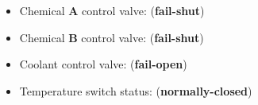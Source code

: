 





\begin{itemize}
\item{} Chemical {\bf A} control valve: ({\bf fail-shut})
\vskip 5pt
\item{} Chemical {\bf B} control valve: ({\bf fail-shut})
\vskip 5pt
\item{} Coolant control valve: ({\bf fail-open})
\vskip 5pt
\item{} Temperature switch status: ({\bf normally-closed})
\end{itemize}












